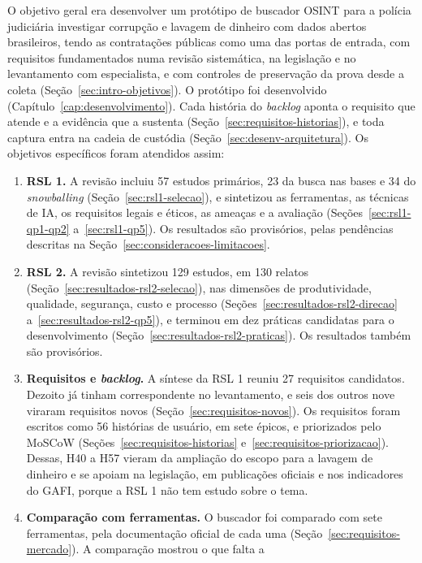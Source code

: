 O objetivo geral era desenvolver um protótipo de buscador OSINT para a
polícia judiciária investigar corrupção e lavagem de dinheiro com dados
abertos brasileiros, tendo as contratações públicas como uma das portas de
entrada, com requisitos fundamentados numa revisão sistemática, na legislação e no
levantamento com especialista, e com controles de preservação da prova desde
a coleta (Seção~\ref{sec:intro-objetivos}). O protótipo foi desenvolvido
(Capítulo~\ref{cap:desenvolvimento}). Cada história do \textit{backlog} aponta
o requisito que atende e a evidência que a sustenta
(Seção~\ref{sec:requisitos-historias}), e toda captura entra na cadeia de
custódia (Seção~\ref{sec:desenv-arquitetura}). Os objetivos específicos foram
atendidos assim:
\begin{enumerate}
	\item \textbf{RSL 1.} A revisão incluiu 57 estudos primários, 23 da busca
	nas bases e 34 do \textit{snowballing} (Seção~\ref{sec:rsl1-selecao}), e
	sintetizou as ferramentas, as técnicas de IA, os requisitos legais e
	éticos, as ameaças e a avaliação
	(Seções~\ref{sec:rsl1-qp1-qp2} a~\ref{sec:rsl1-qp5}). Os resultados são
	provisórios, pelas pendências descritas na
	Seção~\ref{sec:consideracoes-limitacoes}.
	\item \textbf{RSL 2.} A revisão sintetizou 129 estudos, em 130 relatos
	(Seção~\ref{sec:resultados-rsl2-selecao}), nas dimensões de
	produtividade, qualidade, segurança, custo e processo
	(Seções~\ref{sec:resultados-rsl2-direcao}
	a~\ref{sec:resultados-rsl2-qp5}), e terminou em dez práticas candidatas
	para o desenvolvimento (Seção~\ref{sec:resultados-rsl2-praticas}). Os
	resultados também são provisórios.
	\item \textbf{Requisitos e \textit{backlog}.} A síntese da RSL 1 reuniu 27
	requisitos candidatos. Dezoito já tinham correspondente no levantamento,
	e seis dos outros nove viraram requisitos novos
	(Seção~\ref{sec:requisitos-novos}). Os requisitos foram escritos como 56
	histórias de usuário, em sete épicos, e priorizados pelo MoSCoW
	(Seções~\ref{sec:requisitos-historias}
	e~\ref{sec:requisitos-priorizacao}). Dessas, H40 a H57 vieram da
	ampliação do escopo para a lavagem de dinheiro e se apoiam na
	legislação, em publicações oficiais e nos indicadores do GAFI, porque a
	RSL 1 não tem estudo sobre o tema.
	\item \textbf{Comparação com ferramentas.} O buscador foi comparado com
	sete ferramentas, pela documentação oficial de cada uma
	(Seção~\ref{sec:requisitos-mercado}). A comparação mostrou o que falta a

\end{enumerate}
